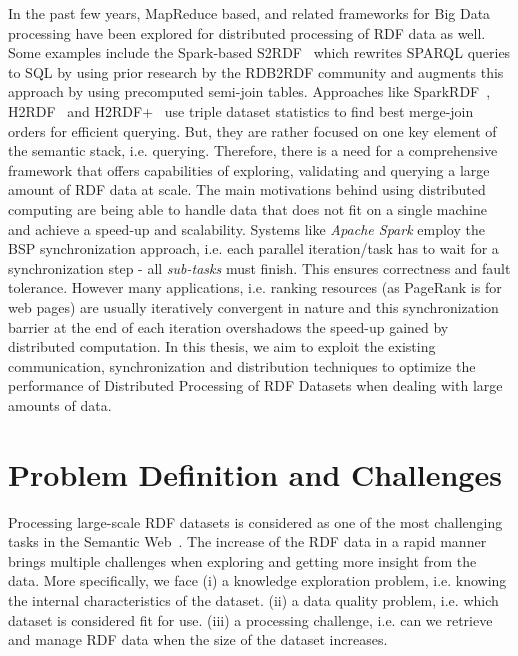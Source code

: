 In the past few years, MapReduce based, and related frameworks for Big Data processing have been explored for distributed processing of \gls{RDF} data as well. 
Some examples include the Spark-based S2RDF~\cite{Schatzle:2016:SRQ:2977797.2977806} which rewrites \gls{SPARQL} queries to SQL by using prior research by the RDB2RDF community and augments this approach by using precomputed semi-join tables. Approaches like SparkRDF~\cite{xu2015sparkrdf}, H2RDF~\cite{papailiou2013h} and H2RDF+~\cite{papailiou2012h2rdf} use triple dataset statistics to find best merge-join orders for efficient querying.
But, they are rather focused on one key element of the semantic stack, i.e. querying.
Therefore, there is a need for a comprehensive framework that offers capabilities of exploring, validating and querying a large amount of \gls{RDF} data at scale.
The main motivations behind using distributed computing are being able to handle data that does not fit on a single machine and achieve a speed-up and scalability.
Systems like \textit{Apache Spark} employ the \gls{BSP} synchronization approach, i.e. each parallel iteration/task has to wait for a synchronization step - all \textit{sub-tasks} must finish. 
This ensures correctness and fault tolerance.
However many applications, i.e. ranking resources (as PageRank is for web pages) are usually iteratively convergent in nature and this synchronization barrier at the end of each iteration overshadows the speed-up gained by distributed computation. 
In this thesis, we aim to exploit the existing communication, synchronization and distribution techniques to optimize the performance of Distributed Processing of \gls{RDF} Datasets when dealing with large amounts of data.

\section{Problem Definition and Challenges}
\label{sec:problem-definition-and-challenges}
Processing large-scale \gls{RDF} datasets is considered as one of the most challenging tasks in the Semantic Web~\cite{Benjamins02sixchallenges}.
The increase of the \gls{RDF} data in a rapid manner brings multiple challenges when exploring and getting more insight from the data.
More specifically, we face (i) a knowledge exploration problem, i.e. knowing the internal characteristics of the dataset. 
(ii) a data quality problem, i.e. which dataset is considered fit for use.
(iii) a processing challenge, i.e. can we retrieve and manage \gls{RDF} data when the size of the dataset increases.

